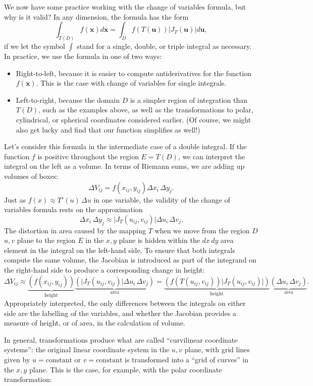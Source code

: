 We now have some practice working with the change of variables formula, but why is it valid? In any dimension, the formula has the form
\[
\int_{T(D)} f(\mathbf{x})d\mathbf{x} = \int_D f(T(\mathbf{u}))\lvert J_T(\mathbf{u})\rvert d\mathbf{u},
\]
if we let the symbol $\int$ stand for a single, double, or triple integral as necessary. In practice, we use the formula in one of two ways:
\begin{itemize}
\item Right-to-left, because it is easier to compute antiderivatives for the function $f(\mathbf{x})$. This is the case with change of variables for single integrals.
\item Left-to-right, because the domain $D$ is a simpler region of integration than $T(D)$, such as the examples above, as well as the transformations to polar, cylindrical, or spherical coordinates considered earlier. (Of course, we might also get lucky and find that our function simplifies as well!)
\end{itemize}
Let's consider this formula in the intermediate case of a double integral. If the function $f$ is positive throughout the region $E=T(D)$, we can interpret the integral on the left as a volume. In terms of Riemann sums, we are adding up volumes of boxes:
\[
\Delta V_{ij} = f(x_{ij},y_{ij})\Delta x_i\,\Delta y_j.
\]
Just as $f(x)\approx T'(u)\,\Delta u$ in one variable, the validity of the change of variables formula rests on the approximation
\[
\Delta x_i\,\Delta y_j \approx \lvert J_T(u_{ij},v_{ij})\rvert \Delta u_i\,\Delta v_j.
\]
The distortion in area caused by the mapping $T$ when we move from the region $D$ $u,v$ plane to the region $E$ in the $x,y$ plane is hidden within the $dx\,dy$ area element in the integral on the left-hand side. To ensure that both integrals compute the same volume, the Jacobian is introduced as part of the integrand on the right-hand side to produce a corresponding change in height:
\[
\Delta V_{ij} \approx \underbrace{\left(f(x_{ij},y_{ij})\right)}_{\text{height}}\underbrace{\left(\lvert J_T(u_{ij},v_{ij})\rvert\Delta u_i\,\Delta v_j\right)}_{\text{area}} = \underbrace{\left(f(T(u_{ij},v_{ij}))\lvert J_T(u_{ij},v_{ij})\rvert\right)}_{\text{height}}\underbrace{\left(\Delta u_i\,\Delta v_j\right)}_{\text{area}}.
\]
Appropriately interpreted, the only differences between the integrals on either side are the labelling of the variables, and whether the Jacobian provides a measure of height, or of area, in the calculation of volume.

In general, transformations produce what are called ``curvilinear coordinate systems'': the original linear coordinate system in the $u,v$ plane, with grid lines given by $u=\text{constant}$ or $v=\text{constant}$ is transformed into a ``grid of curves'' in the $x,y$ plane. This is the case, for example, with the polar coordinate transformation:

